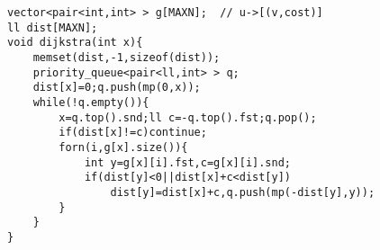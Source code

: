 \begin{verbatim}
vector<pair<int,int> > g[MAXN];  // u->[(v,cost)]
ll dist[MAXN];
void dijkstra(int x){
	memset(dist,-1,sizeof(dist));
	priority_queue<pair<ll,int> > q;
	dist[x]=0;q.push(mp(0,x));
	while(!q.empty()){
		x=q.top().snd;ll c=-q.top().fst;q.pop();
		if(dist[x]!=c)continue;
		forn(i,g[x].size()){
			int y=g[x][i].fst,c=g[x][i].snd;
			if(dist[y]<0||dist[x]+c<dist[y])
				dist[y]=dist[x]+c,q.push(mp(-dist[y],y));
		}
	}
}
\end{verbatim}